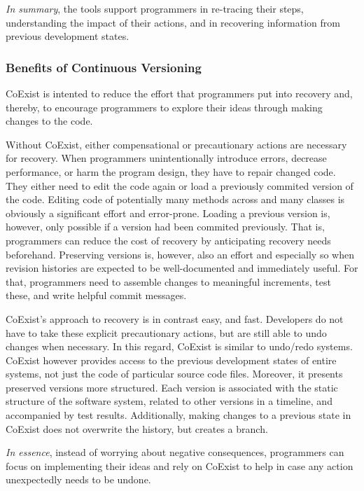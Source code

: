 \emph{In summary}, the tools support programmers in re-tracing their steps, understanding the impact of their actions, and in recovering information from previous development states.


\subsubsection{Benefits of Continuous Versioning}

CoExist is intented to reduce the effort that programmers put into recovery and, thereby, to encourage programmers to explore their ideas through making changes to the code.

Without CoExist, either compensational or precautionary actions are necessary for recovery.
When programmers unintentionally introduce errors, decrease performance, or harm the program design, they have to repair changed code.
They either need to edit the code again or load a previously commited version of the code.
Editing code of potentially many methods across and many classes is obviously a significant effort and error-prone.
Loading a previous version is, however, only possible if a version had been commited previously.
That is, programmers can reduce the cost of recovery by anticipating recovery needs beforehand.
Preserving versions is, however, also an effort and especially so when revision histories are expected to be well-documented and immediately useful.
For that, programmers need to assemble changes to meaningful increments, test these, and write helpful commit messages.

CoExist's approach to recovery is in contrast easy, and fast.
Developers do not have to take these explicit precautionary actions, but are still able to undo changes when necessary.
In this regard, CoExist is similar to undo/redo systems.
CoExist however provides access to the previous development states of entire systems, not just the code of particular source code files.
Moreover, it presents preserved versions more structured.
Each version is associated with the static structure of the software system, related to other versions in a timeline, and accompanied by test results.
Additionally, making changes to a previous state in CoExist does not overwrite the history, but creates a branch.

\emph{In essence}, instead of worrying about negative consequences, programmers can focus on implementing their ideas and rely on CoExist to help in case any action unexpectedly needs to be undone.
